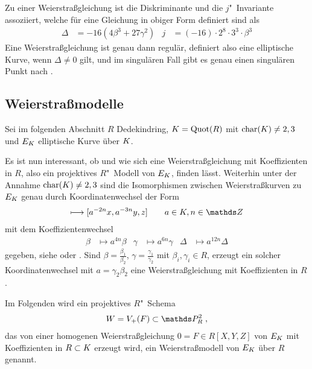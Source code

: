 Zu einer Weierstraßgleichung ist die Diskriminante und die
$j$"~Invariante assoziiert, welche für eine Gleichung in obiger
Form definiert sind als 
\begin{align*}
  \Delta &= -16\left(4\beta^3 + 27\gamma^2\right)
  &j &= (-16)\cdot 2^8\cdot 3^3\cdot\beta^3
\end{align*}
Eine Weierstraßgleichung ist genau dann regulär, definiert also eine
elliptische Kurve, wenn $\Delta\neq 0$ gilt,
und im singulären Fall gibt es genau einen singulären Punkt
nach \cite[Proposition~III.1.4]{silverman}.


\subsection{Weierstraßmodelle}
Sei im folgenden Abschnitt $R$ Dedekindring,
$K=\operatorname{Quot}(R)$ mit $\operatorname{char}(K)\neq2,3$ und $E_{K}$ elliptische Kurve über
$K$.

Es ist nun interessant, ob und wie sich eine Weierstraßgleichung mit
Koeffizienten in $R$, also ein projektives $R$"~Modell von
$E_{K}$, finden lässt.
Weiterhin unter der Annahme ${\operatorname{char}(K)\neq2,3}$ sind die
Isomorphismen zwischen Weierstraßkurven zu $E_{K}$ genau durch
Koordinatenwechsel der Form
\begin{gather*}
  [x,y,z] \longmapsto [a^{-2n}x, a^{-3n}y, z] \qquad a\in\K, n\in\Z
\end{gather*}
mit dem Koeffizientenwechsel
\begin{align*}
  \beta&\mapsto a^{4n}\beta
  &\gamma&\mapsto a^{6n}\gamma
  &\Delta&\mapsto a^{12n}\Delta
\end{align*}
gegeben, siehe \cite[Lemma~1.5/2]{neron}
oder \cite[Chapter~VII.1]{silverman}.
Sind ${\beta=\frac{\beta_1}{\beta_2}}$,
${\gamma=\frac{\gamma_1}{\gamma_2}}$ mit ${\beta_i,\gamma_i\in R}$,
erzeugt ein solcher Koordinatenwechsel mit ${a=\gamma_2\beta_2}$ eine
Weierstraßgleichung mit Koeffizienten in $R$.
\begin{Definition}[Weierstraßmodell]
  Im Folgenden wird ein projektives $R$"~Schema
  \begin{gather*}
    W=V_+(F)\subset\P_R^2\;,
  \end{gather*}
  das von einer homogenen
  Weierstraßgleichung $0=F\in R[X,Y,Z]$ von $E_{K}$ mit Koeffizienten
  in $R\subset K$ erzeugt wird, ein Weierstraßmodell von $E_{K}$ über
  $R$ genannt.
\end{Definition}


